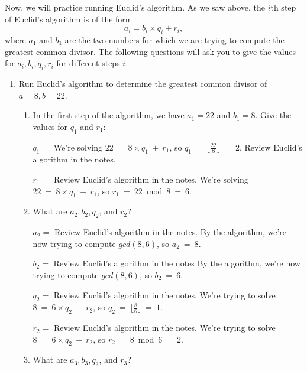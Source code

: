 \documentclass[11pt, preview]{standalone} %
\begin{document}
\begin{enumerate}
Now, we will practice running Euclid's algorithm. As we saw above, the $i$th step of Euclid's algorithm is of the form 
\[
a_i = b_i \times q_i + r_i,
\]
where $a_1$ and $b_1$ are the two numbers for which we are trying to compute the greatest common divisor. The following questions will ask you to give the values for $a_i, b_i, q_i, r_i$ for different steps $i$.
\begin{enumerate}
\item Run Euclid's algorithm to determine the greatest common divisor of $a = 8, b = 22$. 
\begin{enumerate}
\item In the first step of the algorithm, we have $a_1 = 22$ and $b_1 = 8$. Give the values for $q_1$ and $r_1$:
\begin{Freeform}{2}
$q_1 = $
\Solution We're solving $22\ =\ 8 \times q_1\ +\ r_1$, so $q_1\ =\ \lfloor \frac{22}{8} \rfloor\ =\ 2$.
\Hint Review Euclid's algorithm in the notes.
\end{Freeform}
\begin{Freeform}{6}
$r_1 = $
\Hint Review Euclid's algorithm in the notes.
\Solution We're solving $22\ =\ 8 \times q_1\ +\ r_1$, so $r_1\ =\ 22 \bmod 8\ =\ 6$.
\end{Freeform}
\item What are $a_2, b_2, q_2$, and $r_2$?
\begin{Freeform}{8}
$a_2 = $
\Hint Review Euclid's algorithm in the notes.
\Solution By the algorithm, we're now trying to compute $gcd(8, 6)$, so $a_2\ =\ 8$.
\end{Freeform}
\begin{Freeform}{6}
$b_2 = $
\Hint Review Euclid's algorithm in the notes
\Solution By the algorithm, we're now trying to compute $gcd(8, 6)$, so $b_2\ =\ 6$.
\end{Freeform}
\begin{Freeform}{1}
$q_2 = $
\Hint Review Euclid's algorithm in the notes.
\Solution We're trying to solve $8\ =\ 6 \times q_2\ +\ r_2$, so $q_2\ =\ \lfloor \frac{8}{6} \rfloor\ =\ 1$.
\end{Freeform}
\begin{Freeform}{2}
$r_2 = $
\Hint Review Euclid's algorithm in the notes.
\Solution We're trying to solve $8\ =\ 6 \times q_2\ +\ r_2$, so $r_2\ =\ 8 \bmod 6\ =\ 2$.
\end{Freeform}
\item What are $a_3, b_3, q_3$, and $r_3$?
\begin{Freeform}{6}

\end{Freeform}
\end{enumerate}
\end{enumerate}
\end{enumerate}
\end{document}
